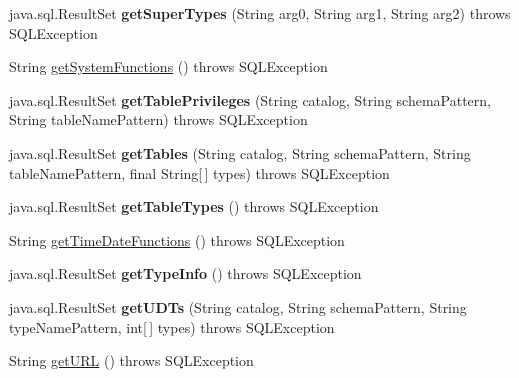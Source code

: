 \begin{DoxyCompactItemize}
java.\+sql.\+Result\+Set {\bfseries get\+Super\+Types} (String arg0, String arg1, String arg2)  throws S\+Q\+L\+Exception 
\item 
String \mbox{\hyperlink{classcom_1_1mysql_1_1cj_1_1jdbc_1_1_database_meta_data_a3227b7f48ec0b980f1a749c4f9544c69}{get\+System\+Functions}} ()  throws S\+Q\+L\+Exception 
\item 
\mbox{\label{classcom_1_1mysql_1_1cj_1_1jdbc_1_1_database_meta_data_adf4cdd4f2a6189234a11e9a7c27be8b1}} 
java.\+sql.\+Result\+Set {\bfseries get\+Table\+Privileges} (String catalog, String schema\+Pattern, String table\+Name\+Pattern)  throws S\+Q\+L\+Exception 
\item 
\mbox{\label{classcom_1_1mysql_1_1cj_1_1jdbc_1_1_database_meta_data_ab5f3f694cbfe95c1f5b7f0afd6ff79d4}} 
java.\+sql.\+Result\+Set {\bfseries get\+Tables} (String catalog, String schema\+Pattern, String table\+Name\+Pattern, final String\mbox{[}$\,$\mbox{]} types)  throws S\+Q\+L\+Exception 
\item 
\mbox{\label{classcom_1_1mysql_1_1cj_1_1jdbc_1_1_database_meta_data_a058dac71420e98cff87127834f9c3c75}} 
java.\+sql.\+Result\+Set {\bfseries get\+Table\+Types} ()  throws S\+Q\+L\+Exception 
\item 
String \mbox{\hyperlink{classcom_1_1mysql_1_1cj_1_1jdbc_1_1_database_meta_data_a8237f7df21503f6c3eeda4a98997aad3}{get\+Time\+Date\+Functions}} ()  throws S\+Q\+L\+Exception 
\item 
\mbox{\label{classcom_1_1mysql_1_1cj_1_1jdbc_1_1_database_meta_data_a052c5701308c5ade28258a7416ffa40f}} 
java.\+sql.\+Result\+Set {\bfseries get\+Type\+Info} ()  throws S\+Q\+L\+Exception 
\item 
\mbox{\label{classcom_1_1mysql_1_1cj_1_1jdbc_1_1_database_meta_data_a04aae07068fdf0bd4783c6f12c551dde}} 
java.\+sql.\+Result\+Set {\bfseries get\+U\+D\+Ts} (String catalog, String schema\+Pattern, String type\+Name\+Pattern, int\mbox{[}$\,$\mbox{]} types)  throws S\+Q\+L\+Exception 
\item 
String \mbox{\hyperlink{classcom_1_1mysql_1_1cj_1_1jdbc_1_1_database_meta_data_a2a8e539e06d048726861836dd282cd27}{get\+U\+RL}} ()  throws S\+Q\+L\+Exception 

\end{DoxyCompactItemize}
